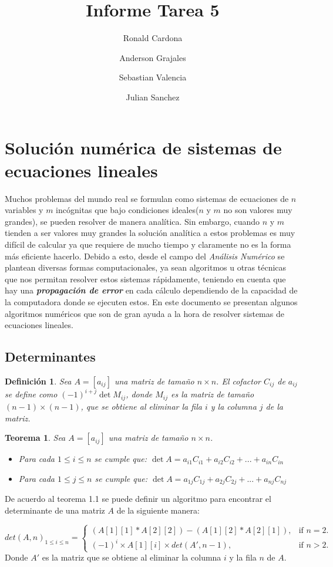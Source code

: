 \documentclass[12pt]{article}
\title{Informe Tarea 5}
\author {Ronald Cardona
\and Anderson Grajales
\and Sebastian Valencia
\and Julian Sanchez}
\newtheorem{definition}{Definición}[section]
\newtheorem{theorem}{Teorema}[section]
\begin{document}
	\maketitle
	\section{Solución numérica de sistemas de ecuaciones lineales}
	Muchos problemas del mundo real se formulan como sistemas de ecuaciones de $n$ variables y $m$ incógnitas que bajo condiciones ideales($n$ y $m$ no son valores muy grandes), se pueden resolver de manera analítica. Sin embargo, cuando $n$ y $m$ tienden a ser valores muy grandes la solución analítica a estos problemas es muy difícil de calcular ya que requiere de mucho tiempo y claramente no es la forma más eficiente hacerlo. Debido a esto, desde el campo del \textit{Análisis Numérico} se plantean diversas formas computacionales, ya sean algoritmos u otras técnicas que nos permitan resolver estos sistemas rápidamente, teniendo en cuenta que hay una \textit{\textbf{propagación de error}} en cada cálculo dependiendo de la capacidad de la computadora donde se ejecuten estos.
	En este documento se presentan algunos algoritmos numéricos que son de gran ayuda a la hora de resolver sistemas de ecuaciones lineales.
	\subsection{Determinantes}
	\begin{definition}
		Sea $A = [a_{ij}]$ una matriz de tamaño $n \times n$. El cofactor $C_{ij}$ de $a_{ij}$ se define como $(-1)^{i+j}\det {M_{ij}}$, donde $M_{ij}$ es la matriz de tamaño $(n - 1) \times (n - 1)$, que se obtiene al eliminar la fila $i$ y la columna $j$ de la matriz.
	\end{definition}
	\begin{theorem}
		Sea $A=[a_{ij}]$ una matriz de tamaño $n \times n$.
		\begin{itemize}
			\item Para cada $1\leq i \leq n$ se cumple que:
			$\det {A} = a_{i1}C_{i1} + a_{i2}C_{i2} + ... + a_{in}C_{in}$
			\item Para cada $1\leq j \leq n$ se cumple que:
			$\det {A} = a_{1j}C_{1j} + a_{2j}C_{2j} + ... + a_{nj}C_{nj}$
		\end{itemize}
	\end{theorem}
	De acuerdo al teorema 1.1 se puede definir un algoritmo para encontrar el determinante de una matriz $A$ de la siguiente manera:
	
	\begin{equation}
	det(A, n)_{1\leq i \leq n}=\begin{cases}
	(A[1][1]*A[2][2]) - (A[1][2] * A[2][1]), & \text{if $n = 2$}.\\
	(-1)^i \times A[1][i] \times det(A', n - 1) , & \text{if $n > 2$}.
	\end{cases}
	\end{equation}
	Donde $A'$ es la matriz que se obtiene al eliminar la columna $i$ y la fila $n$ de $A$.
\end{document}
